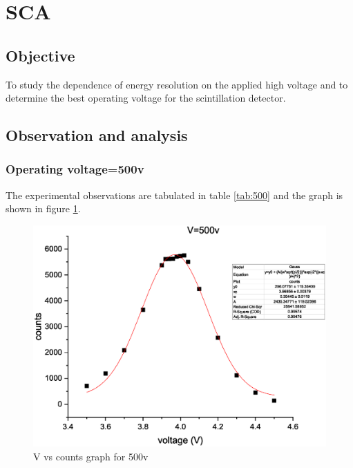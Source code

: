 \section{SCA}
	\subsection{Objective}
	To study the dependence of energy resolution on the applied high voltage and to determine the best operating voltage for the scintillation detector.

	\subsection{Observation and analysis}
		\subsubsection{Operating voltage=500v}
			The experimental observations are tabulated in table \ref{tab:500} and the graph is shown in figure \ref{graph:500}.
			
			\begin{figure}[H]
				\centering
				\includegraphics[width=0.9\columnwidth]{images/Graph1.eps}
				\caption{V vs counts graph for 500v}
				\label{graph:500}
			\end{figure}
